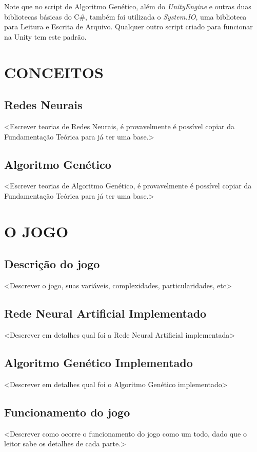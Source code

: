 \documentclass[12pt,a4paper]{article}
\begin{document}
		Note que no script de Algoritmo Genético, além do \textit{UnityEngine} e outras duas bibliotecas básicas do C\#,
		também foi utilizada o \textit{System.IO}, uma biblioteca para Leitura e Escrita de Arquivo.
		Qualquer outro script criado para funcionar na Unity tem este padrão.

\newpage %
\section{CONCEITOS}

	\subsection{Redes Neurais}
	<Escrever teorias de Redes Neurais, é provavelmente é possível copiar da Fundamentação Teórica para já ter uma base.>

	\subsection{Algoritmo Genético}
	<Escrever teorias de Algoritmo Genético, é provavelmente é possível copiar da Fundamentação Teórica para já ter uma base.>

\newpage %
\section{O JOGO}
	
	\subsection{Descrição do jogo}
	<Descrever o jogo, suas variáveis, complexidades, particularidades, etc>
	
	\subsection{Rede Neural Artificial Implementado}
	<Descrever em detalhes qual foi a Rede Neural Artificial implementada>
	
	\subsection{Algoritmo Genético Implementado}
	<Descrever em detalhes qual foi o Algoritmo Genético implementado>
	
	\subsection{Funcionamento do jogo}
	<Descrever como ocorre o funcionamento do jogo como um todo, dado que o leitor sabe os detalhes de cada parte.>
\end{document}
